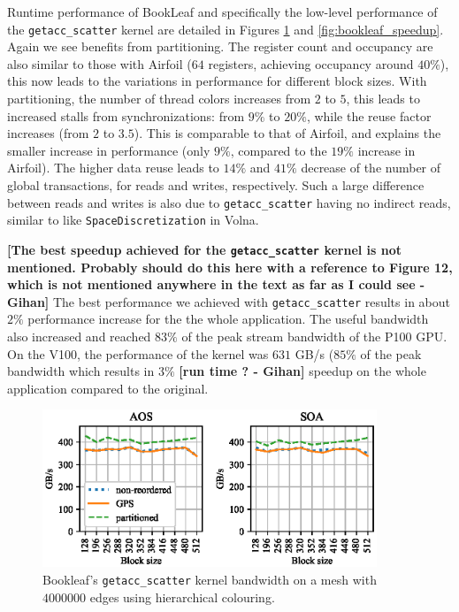 Runtime performance of BookLeaf and specifically the low-level performance of 
the \texttt{getacc\_scatter} kernel are detailed in Figures
\ref{fig:bookleaf_bw-vs-bs_hier} and \ref{fig:bookleaf_speedup}. Again we see  
benefits from partitioning. The register count and occupancy are also similar to 
those with Airfoil ($64$ registers, achieving occupancy around $40\%$), this 
now leads to the variations in performance for different block sizes. With 
partitioning, the number of thread colors increases from $2$ to $5$, this
leads to increased stalls from synchronizations: from $9\%$ to $20\%$, while
the reuse factor increases (from $2$ to $3.5$). This is comparable to 
that of Airfoil, and explains the smaller increase in performance (only $9\%$, 
compared to the $19\%$ increase in Airfoil). The higher data reuse leads to 
$14\%$ and $41\%$ decrease of the number of global transactions, for reads and 
writes, respectively. Such a large difference between reads and writes is also 
due to \texttt{getacc\_scatter} having no indirect reads, similar to 
like \texttt{SpaceDiscretization} in Volna. 

\textbf{[The best speedup achieved for the \texttt{getacc\_scatter} kernel is 
not mentioned. Probably should do this here with a reference to Figure 12, 
which is not mentioned anywhere in the text as far as I could see - Gihan]} The 
best performance we achieved with \texttt{getacc\_scatter} results in about
$2\%$ performance increase for the the whole application. The useful bandwidth
also increased and reached $83\%$ of the peak stream bandwidth of the P100 GPU. 
On the V100, the performance of the kernel was $631$ GB/s ($85\%$ of the peak
bandwidth which results in $3\%$ \textbf{[run time ? - Gihan]} speedup on the 
whole application compared to the original.

\begin{figure}[Htbp]
\centering
\includegraphics[width=10cm]{fig/bookleaf_bw-vs-bs_hier.eps}
\caption{Bookleaf's \texttt{getacc\_scatter} kernel bandwidth on a mesh with 
$4000000$ edges using hierarchical colouring.}
  \label{fig:bookleaf_bw-vs-bs_hier}
\end{figure}

